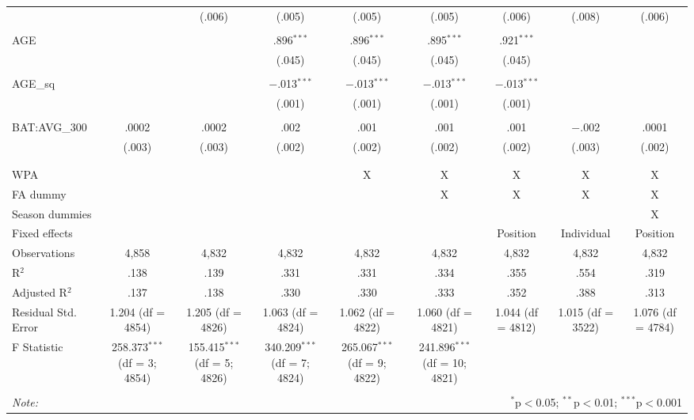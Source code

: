 \begin{table}[H]
\begin{tabular}{@{\extracolsep{5pt}}lcccccccc}
  &  & (.006) & (.005) & (.005) & (.005) & (.006) & (.008) & (.006) \\ 
  & & & & & & & & \\ 
 AGE &  &  & .896$^{***}$ & .896$^{***}$ & .895$^{***}$ & .921$^{***}$ &  &  \\ 
  &  &  & (.045) & (.045) & (.045) & (.045) &  &  \\ 
  & & & & & & & & \\ 
 AGE\_sq &  &  & $-$.013$^{***}$ & $-$.013$^{***}$ & $-$.013$^{***}$ & $-$.013$^{***}$ &  &  \\ 
  &  &  & (.001) & (.001) & (.001) & (.001) &  &  \\ 
  & & & & & & & & \\ 
 BAT:AVG\_300 & .0002 & .0002 & .002 & .001 & .001 & .001 & $-$.002 & .0001 \\ 
  & (.003) & (.003) & (.002) & (.002) & (.002) & (.002) & (.003) & (.002) \\ 
  & & & & & & & & \\ 
\hline \\[-1.8ex] 
WPA &  &  &  & X & X & X & X & X \\ 
FA dummy &  &  &  &  & X & X & X & X \\ 
Season dummies &  &  &  &  &  &  &  & X \\ 
Fixed effects &  &  &  &  &  & Position & Individual & Position \\ 
Observations & 4,858 & 4,832 & 4,832 & 4,832 & 4,832 & 4,832 & 4,832 & 4,832 \\ 
R$^{2}$ & .138 & .139 & .331 & .331 & .334 & .355 & .554 & .319 \\ 
Adjusted R$^{2}$ & .137 & .138 & .330 & .330 & .333 & .352 & .388 & .313 \\ 
Residual Std. Error & 1.204 (df = 4854) & 1.205 (df = 4826) & 1.063 (df = 4824) & 1.062 (df = 4822) & 1.060 (df = 4821) & 1.044 (df = 4812) & 1.015 (df = 3522) & 1.076 (df = 4784) \\ 
F Statistic & 258.373$^{***}$ (df = 3; 4854) & 155.415$^{***}$ (df = 5; 4826) & 340.209$^{***}$ (df = 7; 4824) & 265.067$^{***}$ (df = 9; 4822) & 241.896$^{***}$ (df = 10; 4821) &  &  &  \\ 
\hline 
\hline \\[-1.8ex] 
\textit{Note:}  & \multicolumn{8}{r}{$^{*}$p$<$0.05; $^{**}$p$<$0.01; $^{***}$p$<$0.001} \\ 
\end{tabular} 
\end{table} 
